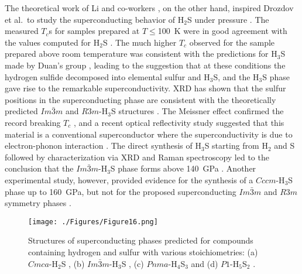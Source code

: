 \documentclass[12pt,letterpaper,oneside]{article}
\begin{document}
The theoretical work of Li and co-workers \cite{Li:2014}, on the other hand, inspired Drozdov et al.\ to study the superconducting behavior of H$_2$S under pressure \cite{Drozdov:2015a}. The measured $T_c$s for samples prepared at  $T\le$100~K were in good agreement with the values computed for H$_2$S \cite{Li:2014}. The much higher $T_c$ observed for the sample prepared above room temperature was consistent with the predictions for H$_3$S made by Duan's group \cite{Duan:2014}, leading to the suggestion that at these conditions the hydrogen sulfide decomposed into elemental sulfur and H$_3$S, and the H$_3$S phase gave rise to the remarkable superconductivity. 
%
XRD has shown that the sulfur positions in the superconducting phase are consistent with the theoretically predicted $Im\bar{3}m$ and $R3m$-H$_3$S structures \cite{Einaga:2016}. The Meissner effect confirmed the record breaking $T_c$ \cite{Troyan:2016-S}, and a recent optical reflectivity study suggested that this material is a conventional superconductor where the superconductivity is due to electron-phonon interaction \cite{Capitani:2017a}. The direct synthesis of H$_3$S starting from H$_2$ and S followed by characterization via XRD and Raman spectroscopy led to the conclusion that the $Im\bar{3}m$-H$_3$S phase forms above 140~GPa \cite{Goncharov:2017}. Another experimental study, however, provided evidence for the synthesis of a $Cccm$-H$_3$S phase up to 160~GPa, but not for the proposed superconducting $Im\bar{3}m$ and $R3m$ symmetry phases \cite{Guigue:2017}. 

\begin{figure}[h!]
\begin{center}
\texttt{[image: ./Figures/Figure16.png]}
\end{center}
\caption{Structures of superconducting phases predicted for compounds containing hydrogen and sulfur with various stoichiometries: (a) $Cmca$-H$_2$S \cite{Li:2014}, (b) $Im\bar{3}m$-H$_3$S \cite{Duan:2014}, (c) $Pnma$-H$_4$S$_3$ \cite{Li:2016-S} and (d) $P1$-H$_5$S$_2$ \cite{Ishikawa:2016}.}
\label{fig:Group16}
\end{figure}
\end{document}
